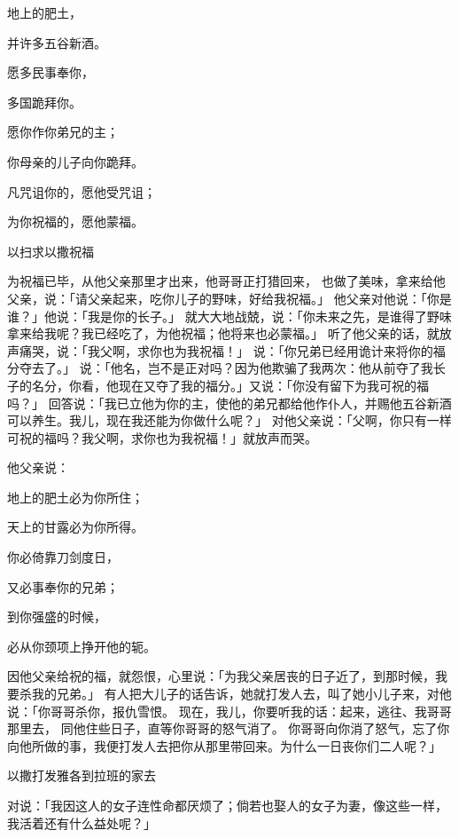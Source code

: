{\par }{\Q 地上的肥土，
\par }{\Q 并许多五谷新酒。
\par }{\Q {}愿多民事奉你，
\par }{\Q 多国跪拜你。
\par }{\Q 愿你作你弟兄的主；
\par }{\Q 你母亲的儿子向你跪拜。
\par }{\Q 凡咒诅你的，愿他受咒诅；
\par }{\Q 为你祝福的，愿他蒙福。
\par }{\SH 以扫求以撒祝福
\par }{\PP {}为{}祝福已毕，{}从他父亲那里才出来，他哥哥{}正打猎回来，
也做了美味，拿来给他父亲，说：「请父亲起来，吃你儿子的野味，好给我祝福。」
他父亲{}对他说：「你是谁？」他说：「我是你的长子{}。」
就大大地战兢，说：「你未来之先，是谁得了野味拿来给我呢？我已经吃了，为他祝福；他将来也必蒙福。」
听了他父亲的话，就放声痛哭，说：「我父啊，求你也为我祝福！」
说：「你兄弟已经用诡计来将你的福分夺去了。」
说：「他名{}，岂不是正对吗？因为他欺骗了我两次：他从前夺了我长子的名分，你看，他现在又夺了我的福分。」{}又说：「你没有留下为我可祝的福吗？」
回答{}说：「我已立他为你的主，使他的弟兄都给他作仆人，并赐他五谷新酒可以养生。我儿，现在我还能为你做什么呢？」
对他父亲说：「父啊，你只有一样可祝的福吗？我父啊，求你也为我祝福！」{}就放声而哭。
\par }{\Q {}他父亲{}说：
\par }{\Q 地上的肥土必为你所住；
\par }{\Q 天上的甘露必为你所得。
\par }{\Q {}你必倚靠刀剑度日，
\par }{\Q 又必事奉你的兄弟；
\par }{\Q 到你强盛的时候，
\par }{\Q 必从你颈项上挣开他的轭。
\par }{\PP {}因他父亲给{}祝的福，就怨恨{}，心里说：「为我父亲居丧的日子近了，到那时候，我要杀我的兄弟{}。」
有人把{}大儿子{}的话告诉{}，她就打发人去，叫了她小儿子{}来，对他说：「你哥哥{}{}杀你，报仇雪恨。
现在，我儿，你要听我的话：起来，逃往{}、我哥哥{}那里去，
同他住些日子，直等你哥哥的怒气消了。
你哥哥向你消了怒气，忘了你向他所做的事，我便打发人去把你从那里带回来。为什么一日丧你们二人呢？」
\par }{\SH 以撒打发雅各到拉班的家去
\par }{\PP {}对{}说：「我因这{}人的女子连性命都厌烦了；倘若{}也娶{}人的女子为妻，像这些一样，我活着还有什么益处呢？」

}
